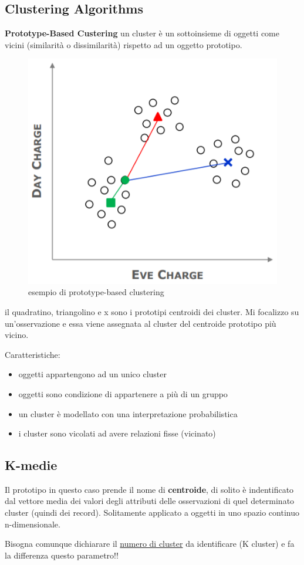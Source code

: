 \subsection{Clustering Algorithms}

\textbf{Prototype-Based Custering} un cluster \`e un sottoinsieme di oggetti come vicini (similarit\`a o dissimilarit\`a) rispetto ad un oggetto prototipo. 

\begin{figure}[h!]
	\centering
	\includegraphics[height=0.4 \linewidth]{pict/prototype_cluster.png}
	\caption{esempio di prototype-based clustering}
\end{figure}

il quadratino, triangolino e x sono i prototipi centroidi dei cluster. Mi focalizzo su un'osservazione e essa viene assegnata al cluster del centroide prototipo pi\`u vicino.

Caratteristiche:
\begin{itemize}
	\item oggetti appartengono ad un unico cluster
	\item oggetti sono condizione di appartenere a pi\`u di un gruppo
	\item un cluster \`e modellato con una interpretazione probabilistica
	\item i cluster sono vicolati ad avere relazioni fisse (vicinato)
\end{itemize}

\subsection{K-medie}
Il prototipo in questo caso prende il nome di \textbf{centroide}, di solito \`e indentificato dal vettore media dei valori degli attributi delle osservazioni di quel determinato cluster (quindi dei record). Solitamente applicato a oggetti in uno spazio continuo n-dimensionale.

Bisogna comunque dichiarare il \underline{numero di cluster} da identificare (K cluster) e fa la differenza questo parametro!! 

